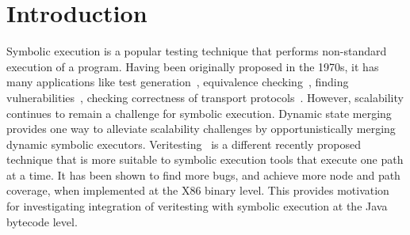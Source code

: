\section{Introduction}
Symbolic execution is a popular testing technique that performs non-standard execution of a program.
%
Having been originally proposed in the 1970s, it has many applications
like test generation~\cite{dart,cute}, equivalence checking~\cite{ramos,adaptorsynth}, finding vulnerabilities~\cite{driller,angr}, checking correctness of transport protocols~\cite{transport}.
%
However, scalability continues to remain a challenge for symbolic execution.
%
Dynamic state merging~\cite{kuznetsov} provides one way to
alleviate scalability challenges by opportunistically merging dynamic
symbolic executors.
%
Veritesting~\cite{veritesting} is a different recently proposed
technique that is more suitable to symbolic execution tools that execute
one path at a time.
%
It has been shown to find more bugs, and achieve more node and path coverage, when implemented at the X86 binary level.
%
This provides motivation for investigating integration of veritesting with symbolic execution at the Java bytecode level.

